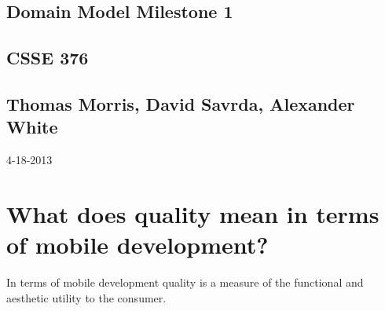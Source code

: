 \documentclass{article}
\begin{document}
	\begin{titlepage}
		\vspace*{\fill}
		\hrulefill
		\begin{center}
			\section*{Domain Model Milestone 1}
			\subsection*{CSSE 376}
			\subsection*{Thomas Morris, David Savrda, Alexander White}
			4-18-2013
		\end{center}
		\hrulefill
		\vspace*{\fill}
	\end{titlepage}
	\newpage
	\section*{What does quality mean in terms of mobile development?}
		In terms of mobile development quality is a measure of the functional and aesthetic utility to the consumer.
\end{document}
